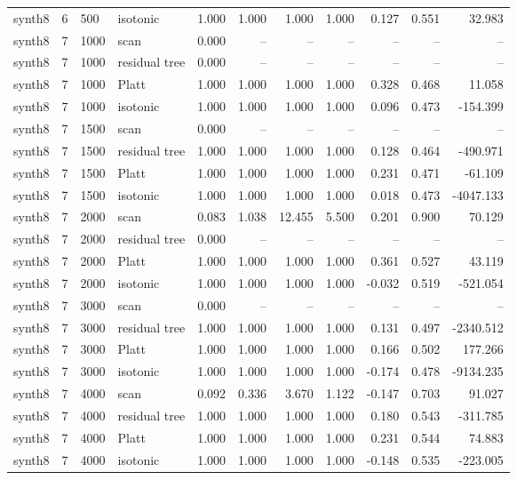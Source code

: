 \begin{tabular}{lrllrrrrrrr}
synth8 & 6 & 500 & isotonic & 1.000 & 1.000 & 1.000 & 1.000 & 0.127 & 0.551 & 32.983 \\
synth8 & 7 & 1000 & scan & 0.000 & -- & -- & -- & -- & -- & -- \\
synth8 & 7 & 1000 & residual tree & 0.000 & -- & -- & -- & -- & -- & -- \\
synth8 & 7 & 1000 & Platt & 1.000 & 1.000 & 1.000 & 1.000 & 0.328 & 0.468 & 11.058 \\
synth8 & 7 & 1000 & isotonic & 1.000 & 1.000 & 1.000 & 1.000 & 0.096 & 0.473 & -154.399 \\
synth8 & 7 & 1500 & scan & 0.000 & -- & -- & -- & -- & -- & -- \\
synth8 & 7 & 1500 & residual tree & 1.000 & 1.000 & 1.000 & 1.000 & 0.128 & 0.464 & -490.971 \\
synth8 & 7 & 1500 & Platt & 1.000 & 1.000 & 1.000 & 1.000 & 0.231 & 0.471 & -61.109 \\
synth8 & 7 & 1500 & isotonic & 1.000 & 1.000 & 1.000 & 1.000 & 0.018 & 0.473 & -4047.133 \\
synth8 & 7 & 2000 & scan & 0.083 & 1.038 & 12.455 & 5.500 & 0.201 & 0.900 & 70.129 \\
synth8 & 7 & 2000 & residual tree & 0.000 & -- & -- & -- & -- & -- & -- \\
synth8 & 7 & 2000 & Platt & 1.000 & 1.000 & 1.000 & 1.000 & 0.361 & 0.527 & 43.119 \\
synth8 & 7 & 2000 & isotonic & 1.000 & 1.000 & 1.000 & 1.000 & -0.032 & 0.519 & -521.054 \\
synth8 & 7 & 3000 & scan & 0.000 & -- & -- & -- & -- & -- & -- \\
synth8 & 7 & 3000 & residual tree & 1.000 & 1.000 & 1.000 & 1.000 & 0.131 & 0.497 & -2340.512 \\
synth8 & 7 & 3000 & Platt & 1.000 & 1.000 & 1.000 & 1.000 & 0.166 & 0.502 & 177.266 \\
synth8 & 7 & 3000 & isotonic & 1.000 & 1.000 & 1.000 & 1.000 & -0.174 & 0.478 & -9134.235 \\
synth8 & 7 & 4000 & scan & 0.092 & 0.336 & 3.670 & 1.122 & -0.147 & 0.703 & 91.027 \\
synth8 & 7 & 4000 & residual tree & 1.000 & 1.000 & 1.000 & 1.000 & 0.180 & 0.543 & -311.785 \\
synth8 & 7 & 4000 & Platt & 1.000 & 1.000 & 1.000 & 1.000 & 0.231 & 0.544 & 74.883 \\
synth8 & 7 & 4000 & isotonic & 1.000 & 1.000 & 1.000 & 1.000 & -0.148 & 0.535 & -223.005 \\

\end{tabular}
